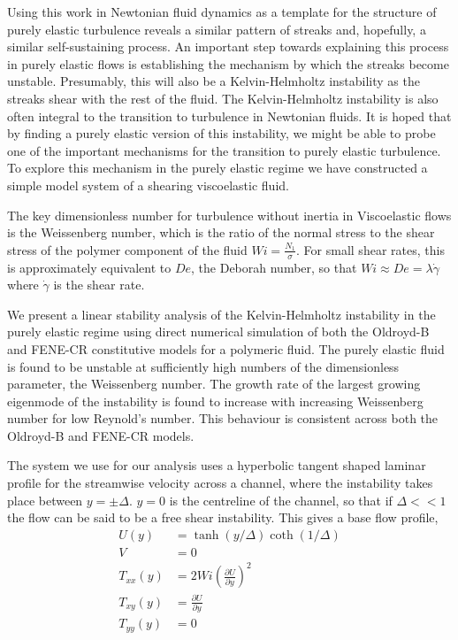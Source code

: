 \documentclass{jfm}
\newcommand{\dy}[1]{\frac{\partial #1}{\partial y}}
\begin{document}
Using this work in Newtonian fluid dynamics as a template for the structure of purely elastic turbulence reveals a similar pattern of streaks and, hopefully, a similar self-sustaining process. An important step towards explaining this process in purely elastic flows is establishing the mechanism by which the streaks become unstable. Presumably, this will also be a Kelvin-Helmholtz instability as the streaks shear with the rest of the fluid. The Kelvin-Helmholtz instability is also often integral to the transition to turbulence in Newtonian fluids. It is hoped that by finding a purely elastic version of this instability, we might be able to probe one of the important mechanisms for the transition to purely elastic turbulence. To explore this mechanism in the purely elastic regime we have constructed a simple model system of a shearing viscoelastic fluid.

The key dimensionless number for turbulence without inertia in Viscoelastic flows is the Weissenberg number, which is the ratio of the normal stress to the shear stress of the polymer component of the fluid $Wi = \frac{N_{1}}{\sigma}$. For small shear rates, this is approximately equivalent to $De$, the Deborah number, so that $Wi \approx De = \lambda \dot{\gamma}$ where $\dot{\gamma}$ is the shear rate.

We present a linear stability analysis of the Kelvin-Helmholtz instability in the purely elastic regime using direct numerical simulation of both the Oldroyd-B and FENE-CR constitutive models for a polymeric fluid. The purely elastic fluid is found to be unstable at sufficiently high numbers of the dimensionless parameter, the Weissenberg number. The growth rate of the largest growing eigenmode of the instability is found to increase with increasing Weissenberg number for low Reynold's number. This behaviour is consistent across both the Oldroyd-B and FENE-CR models.

The system we use for our analysis uses a hyperbolic tangent shaped laminar profile for the streamwise velocity across a channel, where the instability takes place between $y = \pm \Delta$. $y=0$ is the centreline of the channel, so that if $\Delta << 1$ the flow can be said to be a free shear instability. This gives a base flow profile,
\begin{align}
    U(y) &= \tanh \left( y/\Delta \right) \coth \left( 1/\Delta \right) \nonumber\\
    V &= 0 \nonumber \\
    T_{xx}(y) &= 2 Wi \left( \dy{U} \right)^{2} \nonumber \\
    T_{xy}(y) &= \dy{U} \nonumber \\
    T_{yy}(y) &= 0 \nonumber 
    \label{eq:KH_laminar_profile}
\end{align}
\end{document}
